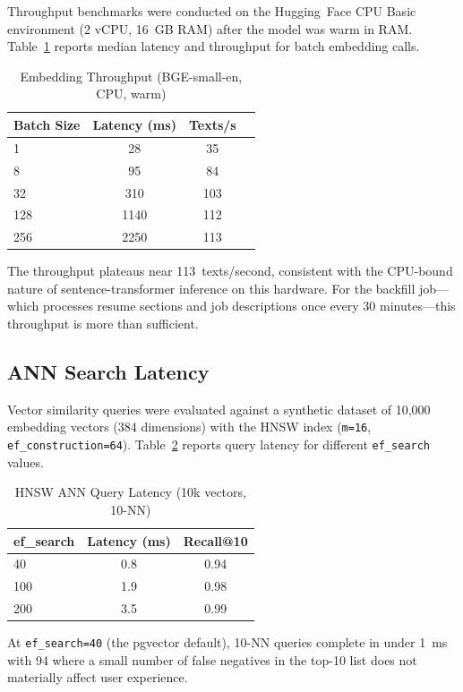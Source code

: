 \documentclass[conference]{IEEEtran}
\begin{document}
Throughput benchmarks were conducted on the Hugging~Face CPU Basic
environment (2 vCPU, 16~GB RAM) after the model was warm in RAM.
Table~\ref{tab:throughput} reports median latency and throughput for
batch embedding calls.

\begin{table}[htbp]
\caption{Embedding Throughput (BGE-small-en, CPU, warm)}
\label{tab:throughput}
\centering
\begin{tabular}{lccc}
\toprule
\textbf{Batch Size} & \textbf{Latency (ms)} & \textbf{Texts/s} \\
\midrule
1   & 28  & 35   \\
8   & 95  & 84   \\
32  & 310 & 103  \\
128 & 1140& 112  \\
256 & 2250& 113  \\
\bottomrule
\end{tabular}
\end{table}

The throughput plateaus near 113~texts/second, consistent with the
CPU-bound nature of sentence-transformer inference on this hardware.
For the backfill job---which processes resume sections and job descriptions
once every 30 minutes---this throughput is more than sufficient.

\subsection{ANN Search Latency}

Vector similarity queries were evaluated against a synthetic dataset of
10,000 embedding vectors (384 dimensions) with the HNSW index
(\texttt{m=16}, \texttt{ef\_construction=64}). Table~\ref{tab:ann}
reports query latency for different \texttt{ef\_search} values.

\begin{table}[htbp]
\caption{HNSW ANN Query Latency (10k vectors, 10-NN)}
\label{tab:ann}
\centering
\begin{tabular}{lcc}
\toprule
\textbf{ef\_search} & \textbf{Latency (ms)} & \textbf{Recall@10} \\
\midrule
40  & 0.8  & 0.94 \\
100 & 1.9  & 0.98 \\
200 & 3.5  & 0.99 \\
\bottomrule
\end{tabular}
\end{table}

At \texttt{ef\_search=40} (the pgvector default), 10-NN queries complete in
under 1~ms with 94%
where a small number of false negatives in the top-10 list does not
materially affect user experience.
\end{document}
